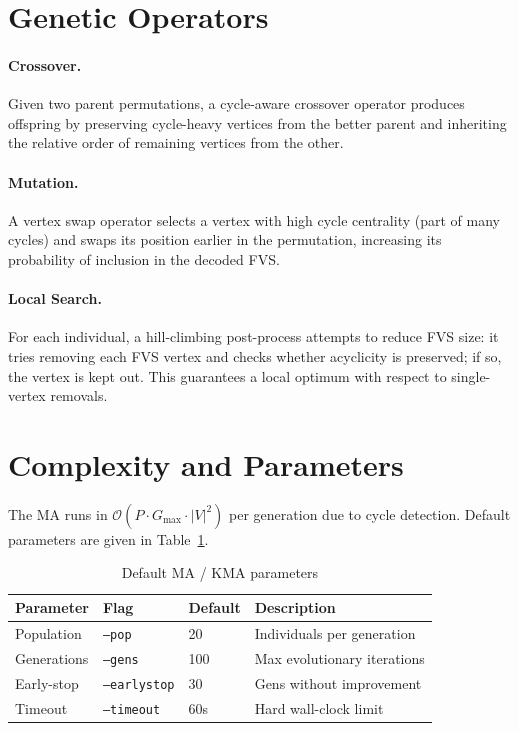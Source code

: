 \documentclass[10pt,a4paper]{report}
\theoremstyle{definition}
\newcommand{\bigO}[1]{\mathcal{O}\!\left(#1\right)}
\begin{document}
\section{Genetic Operators}

\paragraph{Crossover.} Given two parent permutations, a cycle-aware crossover operator produces offspring by preserving cycle-heavy vertices from the better parent and inheriting the relative order of remaining vertices from the other.

\paragraph{Mutation.} A vertex swap operator selects a vertex with high cycle centrality (part of many cycles) and swaps its position earlier in the permutation, increasing its probability of inclusion in the decoded FVS.

\paragraph{Local Search.} For each individual, a hill-climbing post-process attempts to reduce FVS size: it tries removing each FVS vertex and checks whether acyclicity is preserved; if so, the vertex is kept out. This guarantees a local optimum with respect to single-vertex removals.

\section{Complexity and Parameters}

The MA runs in $\bigO{P \cdot G_{\max} \cdot |V|^2}$ per generation due to cycle detection. Default parameters are given in Table~\ref{tab:ma_params}.

\begin{table}[H]
	\centering
	\caption{Default MA / KMA parameters}
	\label{tab:ma_params}
	\begin{tabular}{llll}
		\toprule
		Parameter   & Flag                 & Default & Description                 \\
		\midrule
		Population  & \texttt{--pop}       & 20      & Individuals per generation  \\
		Generations & \texttt{--gens}      & 100     & Max evolutionary iterations \\
		Early-stop  & \texttt{--earlystop} & 30      & Gens without improvement    \\
		Timeout     & \texttt{--timeout}   & 60s    & Hard wall-clock limit       \\
		\bottomrule
	\end{tabular}
\end{table}
\end{document}
